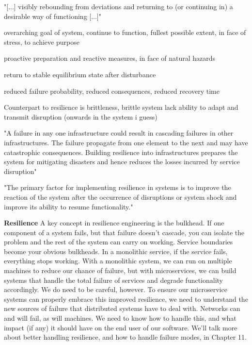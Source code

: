 "[...] visibly rebounding from deviations and returning to (or continuing in) a desirable way of functioning [...]" \cite[p. 6]{strigini2012fault}



overarching goal of system, continue to function, fullest possible extent, in face of stress, to achieve purpose

proactive preparation and reactive measures, in face of natural hazards


return to stable equilibrium state after disturbance


reduced failure probability, reduced consequences, reduced recovery time


Counterpart to resilience is brittleness, brittle system lack ability to adapt and transmit disruption (onwards in the system i guess)


\cite[p. 4]{omer2013resilience}
"A failure in any one infrastructure could result in cascading failures in other infrastructures. The failure propagate from one element to the next and may have catastrophic consequences. Building resilience into infrastructures prepares the system for mitigating disasters and hence reduces the losses incurred by service disruption"


"The primary factor for implementing resilience in systems is to improve the reaction of the system after the occurrence of disruptions or system shock and improve its ability to resume functionality."

\textbf{Resilience} \cite[p. 5]{newman2015microservices} 
A key concept in resilience engineering is the bulkhead. If one component of a system fails, but that failure doesn’t cascade, you can isolate the problem and the rest of the system can carry on working. Service boundaries become your obvious bulkheads. In a monolithic service, if the service fails, everything stops working. With a monolithic system, we can run on multiple machines to reduce our chance of failure, but with microservices, we can build systems that handle the total failure of services and degrade functionality accordingly.
We do need to be careful, however. To ensure our microservice systems can properly embrace this improved resilience, we need to understand the new sources of failure that distributed systems have to deal with. Networks can and will fail, as will machines. We need to know how to handle this, and what impact (if any) it should have on the end user of our software.
We’ll talk more about better handling resilience, and how to handle failure modes, in Chapter 11.

